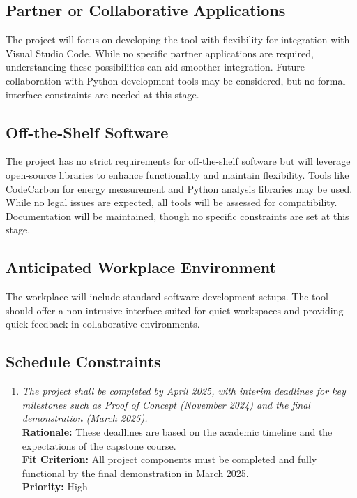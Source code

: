 \documentclass[12pt]{article}
\begin{document}
\subsection{Partner or Collaborative Applications}
The project will focus on developing the tool with flexibility for
integration with Visual Studio Code. While no specific partner
applications are required, understanding these possibilities can aid
smoother integration. Future collaboration with Python development
tools may be considered, but no formal interface constraints are
needed at this stage.
\subsection{Off-the-Shelf Software}
The project has no strict requirements for off-the-shelf software but
will leverage open-source libraries to enhance functionality and
maintain flexibility. Tools like CodeCarbon for energy measurement
and Python analysis libraries may be used. While no legal issues are
expected, all tools will be assessed for compatibility. Documentation
will be maintained, though no specific constraints are set at this stage.
\subsection{Anticipated Workplace Environment}
The workplace will include standard software development setups. The
tool should offer a non-intrusive interface suited for quiet
workspaces and providing quick feedback in collaborative environments.
\subsection{Schedule Constraints}
\begin{enumerate}[label=SCHD \arabic*., wide=0pt, leftmargin=*]
  \item \emph{The project shall be completed by April 2025, with
      interim deadlines for key milestones such as Proof of Concept
    (November 2024) and the final demonstration (March 2025).}\\[2mm]
    {\bf Rationale:} These deadlines are based on the academic
    timeline and the expectations of the capstone course.\\
    {\bf Fit Criterion:} All project components must be completed and
    fully functional by the final demonstration in March 2025.\\
    {\bf Priority:} High
\end{enumerate}
\end{document}
